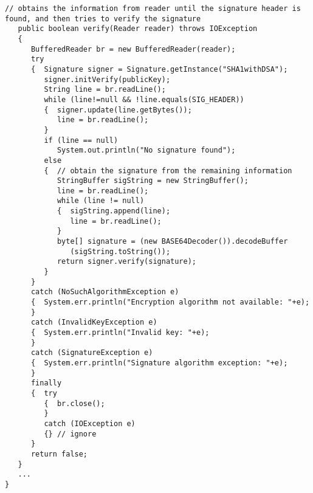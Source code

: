 \begin{lstlisting}[caption=Digital Signature Algorithm]
   // obtains the information from reader until the signature header is found, and then tries to verify the signature
   public boolean verify(Reader reader) throws IOException
   {
      BufferedReader br = new BufferedReader(reader);
      try
      {  Signature signer = Signature.getInstance("SHA1withDSA");
         signer.initVerify(publicKey);
         String line = br.readLine();
         while (line!=null && !line.equals(SIG_HEADER))
         {  signer.update(line.getBytes());
            line = br.readLine();
         }
         if (line == null)
            System.out.println("No signature found");
         else
         {  // obtain the signature from the remaining information
            StringBuffer sigString = new StringBuffer();
            line = br.readLine();
            while (line != null)
            {  sigString.append(line);
               line = br.readLine();
            }
            byte[] signature = (new BASE64Decoder()).decodeBuffer
               (sigString.toString());
            return signer.verify(signature);
         }
      }
      catch (NoSuchAlgorithmException e)
      {  System.err.println("Encryption algorithm not available: "+e);
      }
      catch (InvalidKeyException e)
      {  System.err.println("Invalid key: "+e);
      }
      catch (SignatureException e)
      {  System.err.println("Signature algorithm exception: "+e);
      }
      finally
      {  try
         {  br.close();
         }
         catch (IOException e)
         {} // ignore
      }
      return false;
   }
   ...
}
\end{lstlisting}

